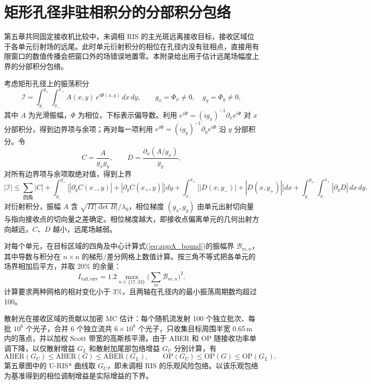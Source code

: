 \thesisappendix

\chapter{矩形孔径非驻相积分的分部积分包络}
\label{app:tail}

第五章共同固定接收机比较中，未调相 RIS 的主光斑远离接收目标，接收区域位于各单元衍射场的远尾。此时单元衍射积分的相位在孔径内没有驻相点，直接用有限窗口的数值传播会把窗口外的场错误地置零。本附录给出用于估计远尾场幅度上界的分部积分包络。

考虑矩形孔径上的振荡积分
\begin{equation}
\mathcal I=\int_{y_-}^{y_+}\int_{x_-}^{x_+}A(x,y)\,e^{i\Phi(x,y)}\,dx\,dy,\qquad
g_x=\Phi_x\ne0,\quad g_y=\Phi_y\ne0,
\label{eq:appA_int}
\end{equation}
其中 $A$ 为光滑振幅，$\Phi$ 为相位，下标表示偏导数。利用 $e^{i\Phi}=(ig_x)^{-1}\partial_xe^{i\Phi}$ 对 $x$ 分部积分，得到边界项与余项；再对每一项利用 $e^{i\Phi}=(ig_y)^{-1}\partial_ye^{i\Phi}$ 沿 $y$ 分部积分。令
\begin{equation}
C=\frac{A}{g_xg_y},\qquad D=\frac{\partial_x(A/g_x)}{g_y},
\label{eq:appA_CD}
\end{equation}
对所有边界项与余项取绝对值，得到上界
\begin{equation}
|\mathcal I|\le\sum_{\text{四角}}|C|
+\int_{y_-}^{y_+}\big[|\partial_yC(x_-,y)|+|\partial_yC(x_+,y)|\big]dy
+\int_{x_-}^{x_+}\big[|D(x,y_-)|+|D(x,y_+)|\big]dx
+\int_{y_-}^{y_+}\!\!\int_{x_-}^{x_+}|\partial_yD|\,dx\,dy.
\label{eq:appA_bound}
\end{equation}
对衍射积分，振幅 $A$ 含 $\sqrt{IT|\det B|}/\lambda_0$，相位梯度 $(g_x,g_y)$ 由单元出射切向量与指向接收点的切向量之差确定。相位梯度越大，即接收点偏离单元的几何出射方向越远，$C$、$D$ 越小，远尾场越弱。

对每个单元，在目标区域的四角及中心计算式(\ref{eq:appA_bound})的振幅界 $\mathcal B_{m,n}$，其中导数与积分在 $n\times n$ 的梯形/差分网格上数值计算。按三角不等式把各单元的场界相加后平方，并取 20\% 的余量：
\begin{equation}
I_{\mathrm{tail,env}}=1.2\max_{n\in\{17,33\}}\Big(\sum_m\mathcal B_{m,n}\Big)^2.
\label{eq:appA_env}
\end{equation}
计算要求两种网格的相对变化小于 3\%，且两轴在孔径内的最小振荡周期数均超过 100。

散射光在接收区域的贡献以加密 MC 估计：每个随机流发射 100 个独立批次、每批 $10^6$ 个光子，合并 6 个独立流共 $6\times10^8$ 个光子，只收集目标周围半宽 0.65\,m 内的落点，并以加权 Scott 带宽的高斯核平滑。由于 ABER 和 OP 随接收功率单调下降，以仅散射增益 $G_L$ 和散射加尾部包络增益 $G_U$ 分别计算，有
\begin{equation}
\mathrm{ABER}(G_U)\le\mathrm{ABER}(G)\le\mathrm{ABER}(G_L),\qquad
\mathrm{OP}(G_U)\le\mathrm{OP}(G)\le\mathrm{OP}(G_L).
\label{eq:appA_sandwich}
\end{equation}
第五章图中的 U-RIS* 曲线取 $G_U$，即未调相 RIS 的乐观风险包络。以该乐观包络为基准得到的相位调制增益是实际增益的下界。

